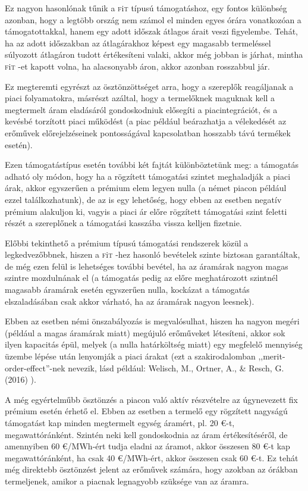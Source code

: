 \documentclass[twoside, magyar, showtrims]{corvinusphd}
\newcommand{\fit}{\textsc{f}i\textsc{t}\index{\textsc{f}i\textsc{t}} }
\begin{document}
Ez nagyon hasonlónak tűnik a \fit típusú támogatáshoz,
egy fontos különbség azonban,
hogy a legtöbb ország nem számol el 
minden egyes órára vonatkozóan a támogatottakkal,
hanem egy adott időszak átlagos árait veszi figyelembe.
Tehát, ha az adott időszakban az átlagárakhoz
képest egy magasabb termeléssel súlyozott
átlagáron tudott értékesíteni valaki, akkor még jobban is járhat, 
mintha \fit-et kapott volna,
ha alacsonyabb áron, akkor azonban rosszabbul jár.

Ez megteremti egyrészt az ösztönzöttséget arra,
hogy a szereplők reagáljanak a piaci folyamatokra,
másrészt azáltal, hogy a termelőknek maguknak 
kell a megtermelt áram eladásáról
gondoskodniuk elősegíti a piacintegrációt, és a kevésbé torzított
piaci működést (a piac például beárazhatja a vélekedését
az erőművek előrejelzéseinek pontosságával
kapcsolatban hosszabb távú termékek esetén).

Ezen támogatástípus esetén további két
fajtát különböztetünk meg:
a támogatás adható oly módon, hogy ha
a rögzített támogatási szintet meghaladják
a piaci árak, akkor egyszerűen a prémium
elem legyen nulla (a német piacon
például ezzel találkozhatunk), de az is egy
lehetőség, hogy ebben az esetben negatív prémium
alakuljon ki, vagyis a piaci ár előre rögzített támogatási szint
feletti részét a szereplőnek a támogatási kasszába vissza kelljen fizetnie.

Előbbi tekinthető a prémium típusú támogatási rendszerek közül
a legkedvezőbbnek, hiszen a \fit-hez hasonló bevételek szinte biztosan
garantáltak, de még ezen felül is lehetséges további bevétel, ha az áramárak
nagyon magas szintre mozdulnának el (a támogatás pedig az előre meghatározott
szintnél magasabb áramárak esetén egyszerűen nulla, kockázat a támogatás
elszaladásában csak akkor várható, ha az áramárak nagyon leesnek).

Ebben az esetben némi önszabályozás is megvalósulhat,
hiszen ha nagyon megéri (például a magas áramárak miatt)
megújuló erőműveket létesíteni, akkor sok ilyen kapacitás épül,
melyek (a nulla határköltség miatt) egy megfelelő mennyiség üzembe lépése
után lenyomják a piaci árakat (ezt a szakirodalomban ,,merit-order-effect''-nek nevezik,
lásd például: Welisch, M., Ortner, A., \& Resch, G. (2016) ).

A még egyértelműbb ösztönzés a piacon való aktív részvételre 
az úgynevezett fix prémium esetén érhető el.
Ebben az esetben a termelő egy rögzített
nagyságú támogatást kap minden megtermelt
egység áramért, pl. 20 €-t, megawattóránként.
Szintén neki kell gondoskodnia az áram értékesítéséről,
de amennyiben 60 €/MWh-ért tudja eladni az áramot,
akkor összesen 80 €-t kap megawattóránként,
ha csak 40 €/MWh-ért, akkor összesen csak 60 €-t.
Ez tehát még direktebb ösztönzést jelent az erőművek
számára, hogy azokban az órákban termeljenek,
amikor a piacnak legnagyobb szüksége van az áramra.
\end{document}
